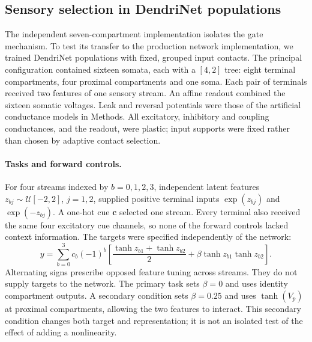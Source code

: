 \subsection{Sensory selection in DendriNet populations}
\label{sec:dendrinet_selection}

The independent seven-compartment implementation isolates the gate mechanism.
To test its transfer to the production network implementation, we trained
DendriNet populations with fixed, grouped input contacts. The principal
configuration contained sixteen somata, each with a $[4,2]$ tree: eight
terminal compartments, four proximal compartments and one soma. Each pair
of terminals received two features of one sensory stream. An affine readout
combined the sixteen somatic voltages. Leak and reversal potentials were
those of the artificial conductance models in Methods. All excitatory,
inhibitory and coupling conductances, and the readout, were plastic; input
supports were fixed rather than chosen by adaptive contact selection.

\paragraph{Tasks and forward controls.}
For four streams indexed by $b=0,1,2,3$, independent latent features
$z_{bj}\sim\mathcal U[-2,2]$, $j=1,2$, supplied positive terminal inputs
$\exp(z_{bj})$ and $\exp(-z_{bj})$. A one-hot cue $\bm c$ selected one stream.
Every terminal also received the same four excitatory cue channels, so none
of the forward controls lacked context information. The targets were
specified independently of the network:
\begin{equation}
y=\sum_{b=0}^3 c_b(-1)^b
\left[\frac{\tanh z_{b1}+\tanh z_{b2}}2
       +\beta\tanh z_{b1}\tanh z_{b2}\right].
\label{eq:si_selection_target}
\end{equation}
Alternating signs prescribe opposed feature tuning across streams. They do
not supply targets to the network. The primary task sets $\beta=0$ and uses
identity compartment outputs. A secondary condition sets $\beta=0.25$ and
uses $\tanh(V_p)$ at proximal compartments, allowing the two features to
interact. This secondary condition changes both target and representation;
it is not an isolated test of the effect of adding a nonlinearity.

